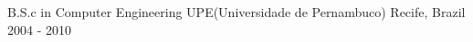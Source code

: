 

\begin{cventries}

  \cventry
    {B.S.c in Computer Engineering} %
    {UPE(Universidade de Pernambuco)} %
    {Recife, Brazil} %
    {2004 - 2010} %
    {
    }

\end{cventries}

